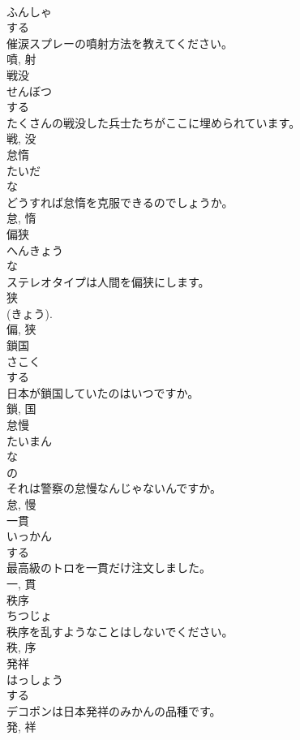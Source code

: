 \documentclass[8pt]{extreport}
\begin{document}
\begin{CJK}{UTF8}{min}
\\	ふんしゃ	
\\	する 
\\	催涙スプレーの噴射方法を教えてください。	
\\	噴, 射	
\\	戦没	
\\	せんぼつ	
\\	する 
\\	たくさんの戦没した兵士たちがここに埋められています。	
\\	戦, 没	
\\	怠惰	
\\	たいだ	
\\	な 
\\	どうすれば怠惰を克服できるのでしょうか。	
\\	怠, 惰	
\\	偏狭	
\\	へんきょう	
\\	な 
\\	ステレオタイプは人間を偏狭にします。	
\\	狭 
\\	(きょう). 
\\	偏, 狭	
\\	鎖国	
\\	さこく	
\\	する 
\\	日本が鎖国していたのはいつですか。	
\\	鎖, 国	
\\	怠慢	
\\	たいまん	
\\	な 
\\	の 
\\	それは警察の怠慢なんじゃないんですか。	
\\	怠, 慢	
\\	一貫	
\\	いっかん	
\\	する 
\\	最高級のトロを一貫だけ注文しました。	
\\	一, 貫	
\\	秩序	
\\	ちつじょ	
\\	秩序を乱すようなことはしないでください。	
\\	秩, 序	
\\	発祥	
\\	はっしょう	
\\	する 
\\	デコポンは日本発祥のみかんの品種です。	
\\	発, 祥	

\end{CJK}
\end{document}
